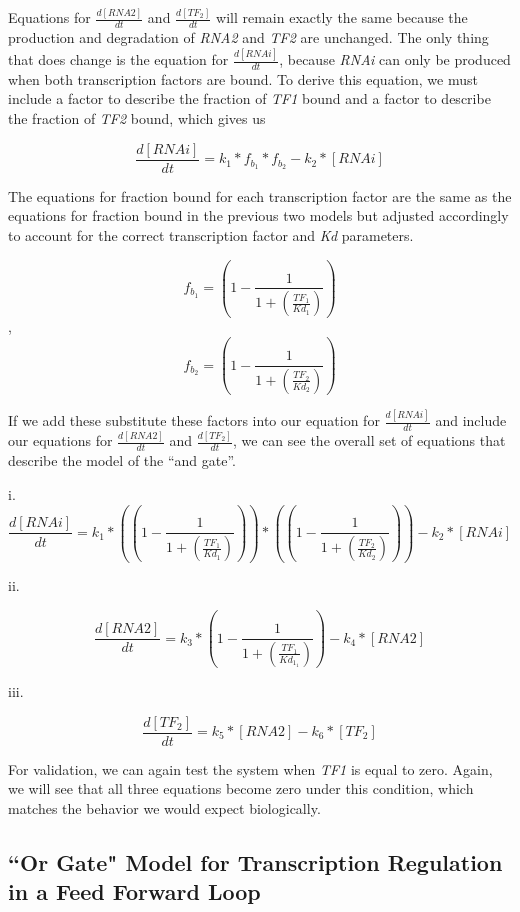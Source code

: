 \documentclass{article}
\begin{document}
Equations for \(\frac{d[RNA2]}{dt}\) and \(\frac{d[TF_2]}{dt}\) will remain exactly the same because the production and degradation of \textit{RNA2} and \textit{TF2} are unchanged. The only thing that does change is the equation for \(\frac{d[RNAi]}{dt}\), because \textit{RNAi} can only be produced when both transcription factors are bound. To derive this equation, we must include a factor to describe the fraction of \textit{TF1} bound and a factor to describe the fraction of \textit{TF2} bound, which gives us

\[
\frac{d[RNAi]}{dt} = k_1 * f_b_1 * f_b_2 - k_2 * [RNAi]
\]

The equations for fraction bound for each transcription factor are the same as the equations for fraction bound in the previous two models but adjusted accordingly to account for the correct transcription factor and \textit{Kd} parameters. 

\[f_b_1 = \left(1 - \frac{1}{1 + \left(\frac{TF_1}{Kd_1}\right)}\right)\], \[f_b_2 = \left(1 - \frac{1}{1 + \left(\frac{TF_2}{Kd_2}\right)}\right)\]

If we add these substitute these factors into our equation for \(\frac{d[RNAi]}{dt}\) and include our equations for \(\frac{d[RNA2]}{dt}\) and \(\frac{d[TF_2]}{dt}\), we can see the overall set of equations that describe the model of the ``and gate''. 

i. 
\[
\frac{d[RNAi]}{dt} = k_1 * (\left(1 - \frac{1}{1 + \left(\frac{TF_1}{Kd_1}\right)}\right)) * (\left(1 - \frac{1}{1 + \left(\frac{TF_2}{Kd_2}\right)}\right)) - k_2 * [RNAi]
\]

ii. 

\[
\frac{d[RNA2]}{dt} = k_3 * \left(1 - \frac{1}{1 + \left(\frac{TF_1}{Kd_1_1}\right)}\right) - k_4 * [RNA2]
\]

iii. 

\[
\frac{d[TF_2]}{dt} = k_5 * [RNA2] - k_6 * [TF_2]
\]

For validation, we can again test the system when \textit{TF1} is equal to zero. Again, we will see that all three equations become zero under this condition, which matches the behavior we would expect biologically. 

\subsection{``Or Gate" Model for Transcription Regulation in a Feed Forward Loop}
\end{document}
